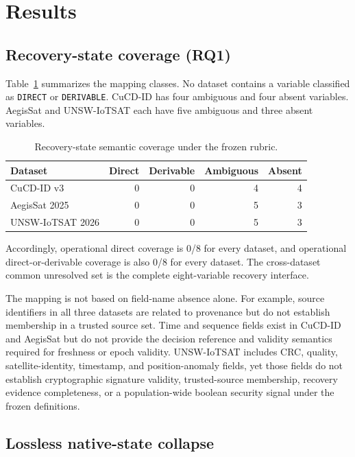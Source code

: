 \documentclass[preprint,12pt]{elsarticle}
\begin{document}
\section{Results}

\subsection{Recovery-state coverage (RQ1)}

Table~\ref{tab:coverage} summarizes the mapping classes. No dataset contains a variable classified as \texttt{DIRECT} or \texttt{DERIVABLE}. CuCD-ID has four ambiguous and four absent variables. AegisSat and UNSW-IoTSAT each have five ambiguous and three absent variables.

\begin{table}[htbp]
\centering
\caption{Recovery-state semantic coverage under the frozen rubric.}
\label{tab:coverage}
\begin{tabular}{lrrrr}
\toprule
Dataset & Direct & Derivable & Ambiguous & Absent \\
\midrule
CuCD-ID v3 & 0 & 0 & 4 & 4 \\
AegisSat 2025 & 0 & 0 & 5 & 3 \\
UNSW-IoTSAT 2026 & 0 & 0 & 5 & 3 \\
\bottomrule
\end{tabular}
\end{table}

Accordingly, operational direct coverage is 0/8 for every dataset, and operational direct-or-derivable coverage is also 0/8 for every dataset. The cross-dataset common unresolved set is the complete eight-variable recovery interface.

The mapping is not based on field-name absence alone. For example, source identifiers in all three datasets are related to provenance but do not establish membership in a trusted source set. Time and sequence fields exist in CuCD-ID and AegisSat but do not provide the decision reference and validity semantics required for freshness or epoch validity. UNSW-IoTSAT includes CRC, quality, satellite-identity, timestamp, and position-anomaly fields, yet those fields do not establish cryptographic signature validity, trusted-source membership, recovery evidence completeness, or a population-wide boolean security signal under the frozen definitions.

\subsection{Lossless native-state collapse}
\end{document}
